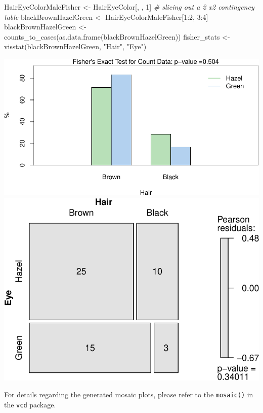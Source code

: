 \documentclass[
]{article}
\newenvironment{Shaded}{\begin{snugshade}}{\end{snugshade}}
\newcommand{\CommentTok}[1]{\textcolor[rgb]{0.56,0.35,0.01}{\textit{#1}}}
\newcommand{\DecValTok}[1]{\textcolor[rgb]{0.00,0.00,0.81}{#1}}
\newcommand{\FunctionTok}[1]{\textcolor[rgb]{0.00,0.00,0.00}{#1}}
\newcommand{\NormalTok}[1]{#1}
\newcommand{\OtherTok}[1]{\textcolor[rgb]{0.56,0.35,0.01}{#1}}
\newcommand{\SpecialCharTok}[1]{\textcolor[rgb]{0.00,0.00,0.00}{#1}}
\newcommand{\StringTok}[1]{\textcolor[rgb]{0.31,0.60,0.02}{#1}}
\begin{document}
\begin{Shaded}
\begin{Highlighting}[]
\NormalTok{HairEyeColorMaleFisher }\OtherTok{\textless{}{-}}\NormalTok{ HairEyeColor[, , }\DecValTok{1}\NormalTok{]}
\CommentTok{\# slicing out a 2 x2 contingency table}
\NormalTok{blackBrownHazelGreen }\OtherTok{\textless{}{-}}\NormalTok{ HairEyeColorMaleFisher[}\DecValTok{1}\SpecialCharTok{:}\DecValTok{2}\NormalTok{, }\DecValTok{3}\SpecialCharTok{:}\DecValTok{4}\NormalTok{]}
\NormalTok{blackBrownHazelGreen }\OtherTok{\textless{}{-}} \FunctionTok{counts\_to\_cases}\NormalTok{(}\FunctionTok{as.data.frame}\NormalTok{(blackBrownHazelGreen))}
\NormalTok{fisher\_stats }\OtherTok{\textless{}{-}} \FunctionTok{visstat}\NormalTok{(blackBrownHazelGreen, }\StringTok{"Hair"}\NormalTok{, }\StringTok{"Eye"}\NormalTok{)}
\end{Highlighting}
\end{Shaded}

\includegraphics[width=1\linewidth]{man/figures/README-unnamed-chunk-11-1}
\includegraphics[width=1\linewidth]{man/figures/README-unnamed-chunk-11-2}

For details regarding the generated mosaic plots, please refer to the
\texttt{mosaic()} in the \texttt{vcd} package.
\end{document}
